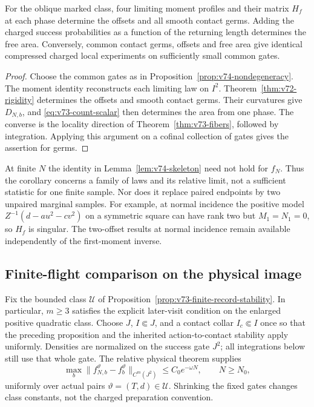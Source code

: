 

\begin{corollary}
\label{cor:v74-invariant}
For the oblique marked class, four limiting moment profiles and their
matrix $H_f$ at each phase determine the offsets and all smooth contact
germs.  Adding the charged success probabilities as a function of the
returning length determines the free area.  Conversely, common contact
germs, offsets and free area give identical compressed charged local
experiments on sufficiently small common gates.
\end{corollary}
\begin{proof}
Choose the common gates as in Proposition~\ref{prop:v74-nondegeneracy}.
The moment identity reconstructs each limiting law on $I^2$.
Theorem~\ref{thm:v72-rigidity} determines the offsets and smooth
contact germs.  Their curvatures give $D_{N,b}$, and
\eqref{eq:v73-count-scalar} then determines the area from one phase.
The converse is the locality direction of
Theorem~\ref{thm:v73-fibers}, followed by integration.  Applying this
argument on a cofinal collection of gates gives the assertion for germs.
\end{proof}

At finite $N$ the identity in Lemma~\ref{lem:v74-skeleton} need not
hold for $f_N$.  Thus the corollary concerns a family of laws and its
relative limit, not a sufficient statistic for one finite sample.
Nor does it replace paired endpoints by two unpaired marginal samples.
For example, at normal incidence the positive model
$Z^{-1}(d-a u^2-c v^2)$ on a symmetric square can have rank two but
$M_1=N_1=0$, so $H_f$ is singular.  The two-offset results at normal
incidence remain available independently of the first-moment inverse.

\subsection{Finite-flight comparison on the physical image}

Fix the bounded class $\mathscr U$ of
Proposition~\ref{prop:v73-finite-record-stability}.  In particular,
$m\ge3$ satisfies the explicit later-visit condition on the enlarged
positive quadratic class.  Choose $J$, $I\Subset J$, and a contact
collar $I_c\Subset I$ once so that the preceding proposition and the
inherited action-to-contact stability apply uniformly.  Densities are
normalized on the success gate $J^2$; all integrations below still use
that whole gate.  The relative physical theorem supplies
\begin{equation}\label{eq:v74-relative}
 \max_b\|f_{N,b}^{\vartheta}-f_b^{\vartheta}\|_{C^m(J^2)}
                     \le C_0e^{-\omega N},\qquad N\ge N_0,
\end{equation}
uniformly over actual pairs $\vartheta=(T,d)\in\mathscr U$.
Shrinking the fixed gates changes class constants, not the charged
preparation convention.

